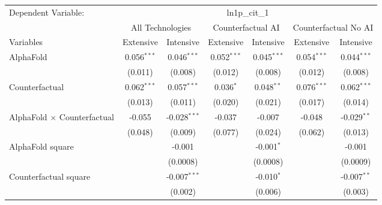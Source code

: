 \begingroup
\centering
\begin{tabular}{lcccccc}
   \tabularnewline \midrule \midrule
   Dependent Variable: & \multicolumn{6}{c}{ln1p\_cit\_1}\\
 & \multicolumn{2}{c}{All Technologies} & \multicolumn{2}{c}{Counterfactual AI} & \multicolumn{2}{c}{Counterfactual No AI} \\
\cmidrule(lr){1-1}\cmidrule(lr){2-3} \cmidrule(lr){4-5} \cmidrule(lr){6-7}
Variables & \multicolumn{1}{c}{Extensive} & \multicolumn{1}{c}{Intensive} & \multicolumn{1}{c}{Extensive} & \multicolumn{1}{c}{Intensive} & \multicolumn{1}{c}{Extensive} & \multicolumn{1}{c}{Intensive} \\
\cmidrule(lr){1-1}\cmidrule(lr){2-2} \cmidrule(lr){3-3} \cmidrule(lr){4-4} \cmidrule(lr){5-5} \cmidrule(lr){6-6} \cmidrule(lr){7-7}
   AlphaFold                          & 0.056$^{***}$ & 0.046$^{***}$  & 0.052$^{***}$ & 0.045$^{***}$ & 0.054$^{***}$ & 0.044$^{***}$\\   
                                      & (0.011)       & (0.008)        & (0.012)       & (0.008)       & (0.012)       & (0.008)\\   
   Counterfactual                     & 0.062$^{***}$ & 0.057$^{***}$  & 0.036$^{*}$   & 0.048$^{**}$  & 0.076$^{***}$ & 0.062$^{***}$\\   
                                      & (0.013)       & (0.011)        & (0.020)       & (0.021)       & (0.017)       & (0.014)\\   
   AlphaFold $\times$ Counterfactual  & -0.055        & -0.028$^{***}$ & -0.037        & -0.007        & -0.048        & -0.029$^{**}$\\   
                                      & (0.048)       & (0.009)        & (0.077)       & (0.024)       & (0.062)       & (0.013)\\   
   AlphaFold square                   &               & -0.001         &               & -0.001$^{*}$  &               & -0.001\\   
                                      &               & (0.0008)       &               & (0.0008)      &               & (0.0009)\\   
   Counterfactual square              &               & -0.007$^{***}$ &               & -0.010$^{*}$  &               & -0.007$^{**}$\\   
                                      &               & (0.002)        &               & (0.006)       &               & (0.003)\\   

\end{tabular}
